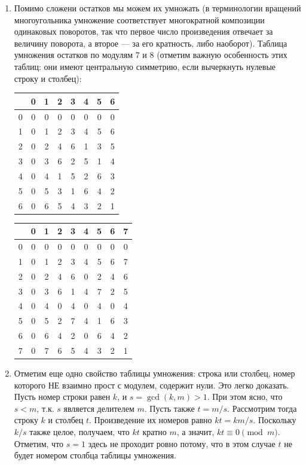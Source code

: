 \begin{enumerate}
\item Помимо сложени остатков мы можем их умножать (в терминологии вращений многоугольника умножение соответствует многократной композиции одинаковых поворотов, так что первое число произведения отвечает за величину поворота, а второе --- за его кратность, либо наоборот).  Таблица умножения остатков по модулям 7 и 8 (отметим важную особенность этих таблиц: они имеют центральную симметрию, если вычеркнуть нулевые строку и столбец):
\begin{center}
\begin{tabular}{c||c||c|c|c|c|c|c|}
  & 0 & 1 & 2 & 3 & 4 & 5 & 6 \\ \hline\hline
0 & 0 & 0 & 0 & 0 & 0 & 0 & 0 \\ \hline\hline
1 & 0 & 1 & 2 & 3 & 4 & 5 & 6 \\ \hline
2 & 0 & 2 & 4 & 6 & 1 & 3 & 5 \\ \hline
3 & 0 & 3 & 6 & 2 & 5 & 1 & 4 \\ \hline
4 & 0 & 4 & 1 & 5 & 2 & 6 & 3 \\ \hline
5 & 0 & 5 & 3 & 1 & 6 & 4 & 2 \\ \hline
6 & 0 & 6 & 5 & 4 & 3 & 2 & 1 \\ \hline
\end{tabular}
\quad
\begin{tabular}{c||c||c|c|c|c|c|c|c|}
  & 0 & 1 & 2 & 3 & 4 & 5 & 6 & 7 \\ \hline\hline
0 & 0 & 0 & 0 & 0 & 0 & 0 & 0 & 0 \\ \hline\hline
1 & 0 & 1 & 2 & 3 & 4 & 5 & 6 & 7 \\ \hline
2 & 0 & 2 & 4 & 6 & 0 & 2 & 4 & 6 \\ \hline
3 & 0 & 3 & 6 & 1 & 4 & 7 & 2 & 5 \\ \hline
4 & 0 & 4 & 0 & 4 & 0 & 4 & 0 & 4 \\ \hline
5 & 0 & 5 & 2 & 7 & 4 & 1 & 6 & 3 \\ \hline
6 & 0 & 6 & 4 & 2 & 0 & 6 & 4 & 2 \\ \hline
7 & 0 & 7 & 6 & 5 & 4 & 3 & 2 & 1 \\ \hline
\end{tabular}
\end{center}
\item Отметим еще одно свойство таблицы умножения: строка или столбец, номер которого НЕ взаимно прост с модулем, содержит нули. Это легко доказать. Пусть номер строки равен $k$, и $s=\gcd(k,m)>1$. При этом ясно, что $s<m$, т.к. $s$ является делителем $m$. Пусть также $t=m/s$. Рассмотрим тогда строку $k$ и столбец $t$. Произведение их номеров равно $kt=km/s$. Поскольку $k/s$ также целое, получаем, что $kt$ кратно $m$, а значит, $kt\equiv 0\pmod m$. Отметим, что $s=1$ здесь не проходит ровно потому, что в этом случае $t$ не будет номером столбца таблицы умножения.

\end{enumerate}
